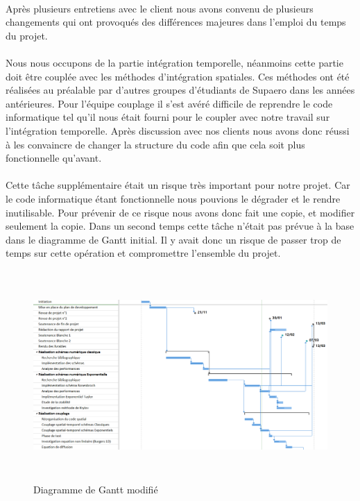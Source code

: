     \paragraph{}
    Après plusieurs entretiens avec le client nous avons convenu de plusieurs changements qui ont provoqués des différences majeures dans l'emploi du temps du projet. 
    \paragraph{}
    Nous nous occupons de la partie intégration temporelle, néanmoins cette partie doit être couplée avec les méthodes d'intégration spatiales. Ces méthodes ont été réalisées au préalable par d'autres groupes d'étudiants de Supaero dans les années antérieures. Pour l'équipe couplage il s'est avéré difficile de reprendre le code informatique tel qu'il nous était fourni pour le coupler avec notre travail sur l'intégration temporelle. Après discussion avec nos clients nous avons donc réussi à les convaincre de changer la structure du code afin que cela soit plus fonctionnelle qu'avant. 
    \paragraph{}
    Cette tâche supplémentaire était un risque très important pour notre projet. Car le code informatique étant fonctionnelle nous pouvions le dégrader et le rendre inutilisable. Pour prévenir de ce risque nous avons donc fait une copie, et modifier seulement la copie. Dans un second temps cette tâche n'était pas prévue à la base dans le diagramme de Gantt initial. Il y avait donc un risque de passer trop de temps sur cette opération et compromettre l'ensemble du projet. 
    \begin{figure}[h]
        \centering
        \includegraphics[width=\textwidth, height=8cm]{images/Gantt_revue_2.PNG}
        \caption{Diagramme de Gantt modifié} 
    \label{fig:Gantt modifié}
    \end{figure}
